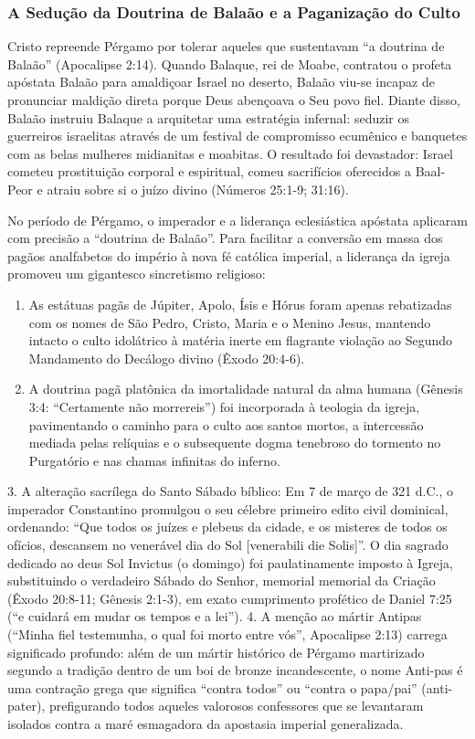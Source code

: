 \documentclass[11pt,a4paper,openany]{book}
\begin{document}
\subsubsection*{A Sedução da Doutrina de Balaão e a Paganização do Culto}
Cristo repreende Pérgamo por tolerar aqueles que sustentavam ``a doutrina de Balaão'' (Apocalipse 2:14). Quando Balaque, rei de Moabe, contratou o profeta apóstata Balaão para amaldiçoar Israel no deserto, Balaão viu-se incapaz de pronunciar maldição direta porque Deus abençoava o Seu povo fiel. Diante disso, Balaão instruiu Balaque a arquitetar uma estratégia infernal: seduzir os guerreiros israelitas através de um festival de compromisso ecumênico e banquetes com as belas mulheres midianitas e moabitas. O resultado foi devastador: Israel cometeu prostituição corporal e espiritual, comeu sacrifícios oferecidos a Baal-Peor e atraiu sobre si o juízo divino (Números 25:1-9; 31:16).

No período de Pérgamo, o imperador e a liderança eclesiástica apóstata aplicaram com precisão a ``doutrina de Balaão''. Para facilitar a conversão em massa dos pagãos analfabetos do império à nova fé católica imperial, a liderança da igreja promoveu um gigantesco sincretismo religioso:
\begin{enumerate}
  \item As estátuas pagãs de Júpiter, Apolo, Ísis e Hórus foram apenas rebatizadas com os nomes de São Pedro, Cristo, Maria e o Menino Jesus, mantendo intacto o culto idolátrico à matéria inerte em flagrante violação ao Segundo Mandamento do Decálogo divino (Êxodo 20:4-6).
  \item A doutrina pagã platônica da imortalidade natural da alma humana (Gênesis 3:4: ``Certamente não morrereis'') foi incorporada à teologia da igreja, pavimentando o caminho para o culto aos santos mortos, a intercessão mediada pelas relíquias e o subsequente dogma tenebroso do tormento no Purgatório e nas chamas infinitas do inferno.
\end{enumerate}

3. A alteração sacrílega do Santo Sábado bíblico: Em 7 de março de 321 d.C., o imperador Constantino promulgou o seu célebre primeiro edito civil dominical, ordenando: ``Que todos os juízes e plebeus da cidade, e os misteres de todos os ofícios, descansem no venerável dia do Sol [venerabili die Solis]''. O dia sagrado dedicado ao deus Sol Invictus (o domingo) foi paulatinamente imposto à Igreja, substituindo o verdadeiro Sábado do Senhor, memorial memorial da Criação (Êxodo 20:8-11; Gênesis 2:1-3), em exato cumprimento profético de Daniel 7:25 (``e cuidará em mudar os tempos e a lei'').
4. A menção ao mártir Antipas (``Minha fiel testemunha, o qual foi morto entre vós'', Apocalipse 2:13) carrega significado profundo: além de um mártir histórico de Pérgamo martirizado segundo a tradição dentro de um boi de bronze incandescente, o nome Anti-pas é uma contração grega que significa ``contra todos'' ou ``contra o papa/pai'' (anti-pater), prefigurando todos aqueles valorosos confessores que se levantaram isolados contra a maré esmagadora da apostasia imperial generalizada.
\end{document}
